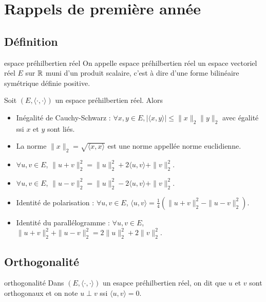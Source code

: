 \section{Rappels de première année}
\subsection{Définition}

\begin{definition}{espace préhilbertien réel}{}
    On appelle espace préhilbertien réel un espace vectoriel réel $E$
    sur $\mathbb{R}$ muni d'un produit scalaire, c'est à dire d'une forme 
    bilinéaire symétrique définie positive.
\end{definition}

\begin{proposition}{}{}
    Soit $(E, \langle \cdot, \cdot \rangle)$ un espace préhilbertien réel. Alors
    \begin{itemize}
        \item Inégalité de Cauchy-Schwarz : $\forall x, y \in E, |\langle x, y \rangle| \leqslant \|x\|_2 \|y\|_2$ avec 
        égalité ssi $x$ et $y$ sont liés.
        \item La norme $\|x\|_2 = \sqrt{\langle x, x \rangle}$ est une norme appellée norme euclidienne.
        \item $\forall u, v \in E$, $\|u + v\|_2^2 = \|u\|_2^2 + 2\langle u, v \rangle + \|v\|_2^2$.
        \item $\forall u, v \in E$, $\|u - v\|_2^2 = \|u\|_2^2 - 2\langle u, v \rangle + \|v\|_2^2$.
        \item Identité de polarisation : $\forall u, v \in E$, $\langle u, v \rangle = \frac{1}{4}(\|u + v\|_2^2 - \|u - v\|_2^2)$.
        \item Identité du parallélogramme : $\forall u, v \in E$, $\|u + v\|_2^2 + \|u - v\|_2^2 = 2\|u\|_2^2 + 2\|v\|_2^2$.
    \end{itemize}
\end{proposition}

\subsection{Orthogonalité}

\begin{definition}{orthogonalité}{}
    Dans $(E, \langle \cdot, \cdot \rangle)$ un esapce préhilbertien réel, on dit que 
    $u$ et $v$ sont orthogonaux et on note $u \perp v$ ssi $\langle u, v \rangle = 0$.
\end{definition}

